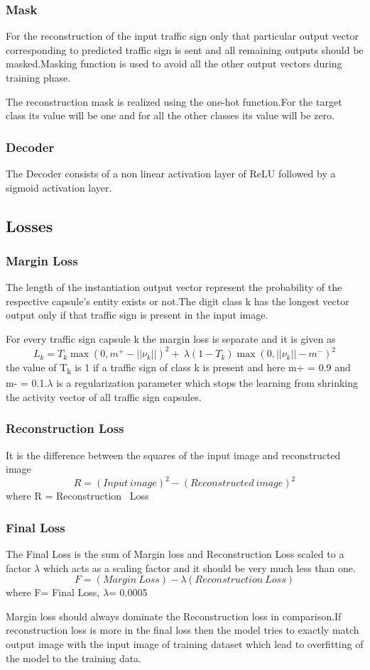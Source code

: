 \documentclass[letterpaper, 10 pt, conference]{ieeeconf}  %
\begin{document}
\subsubsection{Mask}
For the reconstruction of the input traffic sign only that particular output vector corresponding to predicted traffic sign is sent and all remaining outputs should be masked.Masking function is used to avoid all the other output vectors during training phase.\par
The reconstruction mask is realized using the one-hot function.For the target class its value will be one and for all the other classes its value will be zero.

\subsubsection{Decoder}
The Decoder consists of a non linear activation layer of ReLU followed by a sigmoid activation layer.

\subsection{Losses}



\subsubsection{Margin Loss}
The length  of the instantiation output vector represent the probability of the respective capsule's entity exists or not.The digit class k has the longest vector output only if that traffic sign is present in the input image.\par
For every traffic sign capsule k the margin loss is separate and it is given as
$$
L_{k} = T_{k}\max(0,m^{+}-||\nu_{k}||)^{2}+\ \lambda(1- T_{k})\max(0,||\nu_{k}||-m^{-})^{2}
$$
the value of T\textsubscript{k} is 1 if a traffic sign of class k is present and here m+ = 0.9 and m- = 0.1.$\lambda$ is a regularization parameter which stops the learning from shrinking the activity vector of all traffic sign capsules.

\subsubsection{Reconstruction Loss}
It is the difference between the squares of the input image and reconstructed image
$$
R = (Input \ image)^{2} - (Reconstructed \ image)^{2} 
$$
where R = Reconstruction \ Loss
\subsubsection{Final Loss}
The Final Loss is the sum of Margin loss and Reconstruction Loss scaled to a factor $\lambda$ which acts as a scaling factor and it should be very much less than one.
$$
F = (Margin \ Loss) - \lambda (Reconstruction \ Loss)
$$
where F= Final Loss, $\lambda$= 0.0005 \par
Margin loss should always dominate the Reconstruction loss in comparison.If reconstruction loss is more in the final loss then the model tries to exactly match output image with the input image of training dataset which lead to overfitting of the model to the training data.
\end{document}

